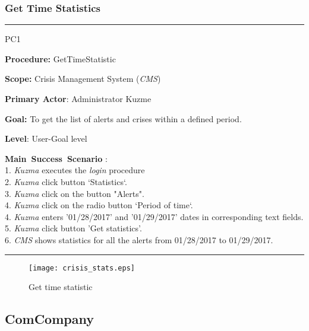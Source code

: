 \subsubsection{Get Time Statistics}
\vspace{0.5cm}
\hrule
\begin{lyxlist}{PC1}
\small{
\item [\textbf{Procedure:}] GetTimeStatistic
\item [\textbf{Scope:}] Crisis Management System (\emph{CMS})
\item [\textbf{Primary Actor}:] Administrator Kuzme
\item [\textbf{Goal:}] To get the list of alerts and crises within a defined
period.
\item [\textbf{Level}:] User-Goal level
\item [\textbf{Main~Success~Scenario}]:\\
1. \emph{Kuzma} executes the \emph{login} procedure\\
2. \emph{Kuzma} click button `Statistics`.\\
3. \emph{Kuzma} click on the button "Alerts".\\
4. \emph{Kuzma} click on the radio button `Period of time`.\\
4. \emph{Kuzma} enters '01/28/2017' and '01/29/2017' dates in corresponding text
fields.\\
5. \emph{Kuzma} click button 'Get statistics'. \\
6. \emph{CMS} shows statistics for all the alerts from 01/28/2017 to
01/29/2017.
}
\end{lyxlist}
\hrule
\vspace{0.5cm}

\begin{figure}[h]
    \texttt{[image: crisis\_stats.eps]}
	\caption{Get time statistic}
\end{figure}

\subsection{ComCompany}

